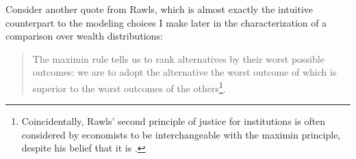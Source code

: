 \documentclass[../../../00-main.tex]{subfiles}
\begin{document}
\par Consider another quote from Rawls, which is almost exactly the intuitive counterpart to the modeling choices I make later in the characterization of a comparison over wealth distributions:

\begin{quote}

The maximin rule tells us to rank alternatives by their worst possible outcomes: we are to adopt the alternative the worst outcome of which is superior to the worst outcomes of the others\footnote{Coincidentally, Rawls' second principle of justice for institutions is often considered by economists to be interchangeable with the maximin principle, despite his belief that it is .}.

\end{quote}
\end{document}
